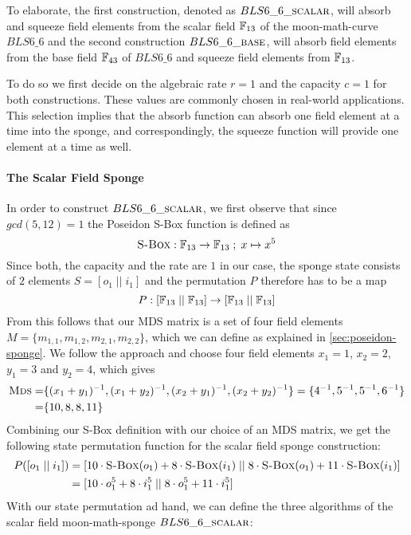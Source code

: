 To elaborate, the first construction, denoted as $BLS6\_6\_\textsc{scalar}$, will absorb and squeeze field elements from the scalar field $\mathbb{F}_{13}$ of the moon-math-curve $BLS6\_6$ and the second construction $BLS6\_6\_\textsc{base}$, will absorb field elements from the base field $\mathbb{F}_{43}$ of $BLS6\_6$ and squeeze field elements from $\mathbb{F}_{13}$. 

To do so we first decide on the algebraic rate $r=1$ and the capacity $c=1$ for both constructions. These values are commonly chosen in real-world applications. This selection implies that the absorb function can absorb one field element at a time into the sponge, and correspondingly, the squeeze function will provide one element at a time as well.
\paragraph{The Scalar Field Sponge} In order to construct $BLS6\_6\_\textsc{scalar}$, we first observe that since $gcd(5,12)=1$ the Poseidon S-Box function is defined as 
$$
\textsc{S-Box}: \mathbb{F}_{13} \to \mathbb{F}_{13}\;;\; x \mapsto x^5
$$
Since both, the capacity and the rate are $1$ in our case,  the sponge state consists of $2$ elements $S=[o_1\;||\;i_1]$ and the permutation $P$ therefore has to be a map 
$$ 
P : [\mathbb{F}_{13}\;||\; \mathbb{F}_{13}] \to [\mathbb{F}_{13}\;||\; \mathbb{F}_{13}]
$$
From this follows that our MDS matrix is a set of four field elements $M = \{m_{1,1}, m_{1,2}, m_{2,1},  m_{2,2}\}$, which we can define as explained in \ref{sec:poseidon-sponge}. We follow the approach and choose four field elements
$x_1=1$, $x_2=2$, $y_1=3$ and $y_2=4$, which gives
\begin{align*}
\textsc{Mds} = & \{(x_1+y_1)^{-1},(x_1+y_2)^{-1}, (x_2+y_1)^{-1},(x_2+y_2)^{-1}\}
    =  \{4^{-1},5^{-1}, 5^{-1},6^{-1}\}\\
    = & \{10,8,8,11\}
\end{align*}
Combining our S-Box definition with our choice of an MDS matrix, we get the following state permutation function for the scalar field sponge construction:
\begin{align}
P([o_1\;||\;i_1]) &= [10\cdot \textsc{S-Box}(o_1) + 8\cdot \textsc{S-Box}(i_1) \;||\; 8\cdot \textsc{S-Box}(o_1) + 11\cdot \textsc{S-Box}(i_1)]\\
  &= [10\cdot o_1^5 + 8\cdot i_1^5 \;||\; 8\cdot o_1^5 + 11\cdot i_1^5]
\end{align}
With our state permutation ad hand, we can define the three algorithms of the scalar field moon-math-sponge $BLS6\_6\_\textsc{scalar}$:
